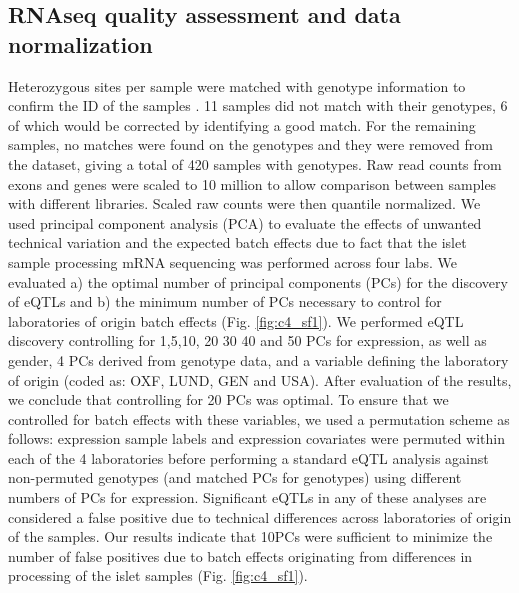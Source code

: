 \subsection{RNAseq quality assessment and data normalization}
Heterozygous sites per sample were matched with genotype information to confirm the ID of the samples \cite{thoenReproducibilityHighthroughputMRNA2013}. 11 samples did not match with their genotypes, 6 of which would be corrected by identifying a good match. For the remaining samples, no matches were found on the genotypes and they were removed from the dataset, giving a total of 420 samples with genotypes. Raw read counts from exons and genes were scaled to 10 million to allow comparison between samples with different libraries. Scaled raw counts were then quantile normalized. We used principal component analysis (PCA) to evaluate the effects of unwanted technical variation and the expected batch effects due to fact that the islet sample processing mRNA sequencing was performed across four labs. We evaluated a) the optimal number of principal components (PCs) for the discovery of eQTLs and b) the minimum number of PCs necessary to control for laboratories of origin batch effects (Fig. \ref{fig:c4_sf1}). We performed eQTL discovery controlling for 1,5,10, 20 30 40 and 50 PCs for expression, as well as gender, 4 PCs derived from genotype data, and a variable defining the laboratory of origin (coded as: OXF, LUND, GEN and USA). After evaluation of the results, we conclude that controlling for 20 PCs was optimal. To ensure that we controlled for batch effects with these variables, we used a permutation scheme as follows: expression sample labels and expression covariates were permuted within each of the 4 laboratories before performing a standard eQTL analysis against non-permuted genotypes (and matched PCs for genotypes) using different numbers of PCs for expression. Significant eQTLs in any of these analyses are considered a false positive due to technical differences across laboratories of origin of the samples. Our results indicate that 10PCs were sufficient to minimize the number of false positives due to batch effects originating from differences in processing of the islet samples (Fig. \ref{fig:c4_sf1}).	

